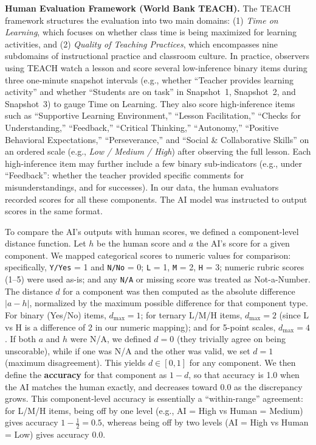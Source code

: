 \documentclass[12pt]{article}
\begin{document}
\textbf{Human Evaluation Framework (World Bank TEACH).} The TEACH framework structures the evaluation into two main domains: (1) \textit{Time on Learning}, which focuses on whether class time is being maximized for learning activities, and (2) \textit{Quality of Teaching Practices}, which encompasses nine subdomains of instructional practice and classroom culture. In practice, observers using TEACH watch a lesson and score several low-inference binary items during three one-minute snapshot intervals (e.g., whether “Teacher provides learning activity” and whether “Students are on task” in Snapshot~1, Snapshot~2, and Snapshot~3) to gauge Time on Learning. They also score high-inference items such as “Supportive Learning Environment,” “Lesson Facilitation,” “Checks for Understanding,” “Feedback,” “Critical Thinking,” “Autonomy,” “Positive Behavioral Expectations,” “Perseverance,” and “Social \& Collaborative Skills” on an ordered scale (e.g., \textit{Low / Medium / High}) after observing the full lesson. Each high-inference item may further include a few binary sub-indicators (e.g., under “Feedback”: whether the teacher provided specific comments for misunderstandings, and for successes). In our data, the human evaluators recorded scores for all these components. The AI model was instructed to output scores in the same format.

To compare the AI’s outputs with human scores, we defined a component-level distance function. Let \(h\) be the human score and \(a\) the AI’s score for a given component. We mapped categorical scores to numeric values for comparison: specifically, \texttt{Y/Yes} = 1 and \texttt{N/No} = 0; \texttt{L} = 1, \texttt{M} = 2, \texttt{H} = 3; numeric rubric scores (1–5) were used as-is; and any \texttt{N/A} or missing score was treated as Not-a-Number. The distance \(d\) for a component was then computed as the absolute difference \(\lvert a - h \rvert\), normalized by the maximum possible difference for that component type. For binary (Yes/No) items, \(d_{\max} = 1\); for ternary L/M/H items, \(d_{\max} = 2\) (since L vs H is a difference of 2 in our numeric mapping); and for 5-point scales, \(d_{\max} = 4\). If both \(a\) and \(h\) were  N/A, we defined \(d = 0\) (they trivially agree on being unscorable), while if one was N/A and the other was valid, we set \(d = 1\) (maximum disagreement). This yields \(d \in [0,1]\) for any component. We then define the \textbf{accuracy} for that component as \(1 - d\), so that accuracy is 1.0 when the AI matches the human exactly, and decreases toward 0.0 as the discrepancy grows. This component-level accuracy is essentially a “within-range” agreement: for L/M/H items, being off by one level (e.g., AI = High vs Human = Medium) gives accuracy \(1 - \tfrac{1}{2} = 0.5\), whereas being off by two levels (AI = High vs Human = Low) gives accuracy \(0.0\).
\end{document}
